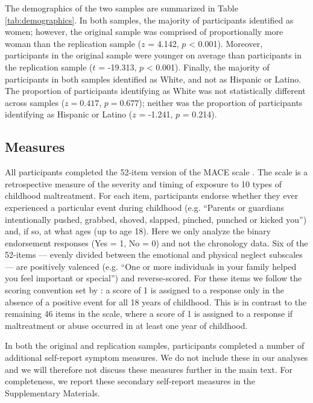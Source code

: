\documentclass[letterpaper,man,natbib,floatsintext,longtable]{apa6}
\begin{document}
The demographics of the two samples are summarized in Table \ref{tab:demographics}. In both samples, the majority of participants identified as women; however, the original sample was comprised of proportionally more woman than the replication sample ($z$ = 4.142, $p$ < 0.001). Moreover, participants in the original sample were younger on average than participants in the replication sample ($t$ = -19.313, $p$ < 0.001). Finally, the majority of participants in both samples identified as White, and not as Hispanic or Latino. The proportion of participants identifying as White was not statistically different across samples ($z = 0.417$, $p = 0.677$); neither was the proportion of participants identifying as Hispanic or Latino ($z$ = -1.241, $p$ = 0.214).

\subsection{Measures}

All participants completed the 52-item version of the MACE scale \citep{teicher2015maltreatment}. The scale is a retrospective measure of the severity and timing of exposure to 10 types of childhood maltreatment. For each item, participants endorse whether they ever experienced a particular event during childhood (e.g. ``Parents or guardians intentionally pushed, grabbed, shoved, slapped, pinched, punched or kicked you'') and, if so, at what ages (up to age 18). Here we only analyze the binary endorsement responses (Yes = 1, No = 0) and not the chronology data. Six of the 52-items --- evenly divided between the emotional and physical neglect subscales --- are positively valenced (e.g. ``One or more individuals in your family helped you feel important or special'') and reverse-scored. For these items we follow the scoring convention set by \cite{teicher2015maltreatment}: a score of 1 is assigned to a response only in the absence of a positive event for all 18 years of childhood. This is in contrast to the remaining 46 items in the scale, where a score of 1 is assigned to a response if maltreatment or abuse occurred in at least one year of childhood.

In both the original and replication samples, participants completed a number of additional self-report symptom measures. We do not include these in our analyses and we will therefore not discuss these measures further in the main text. For completeness, we report these secondary self-report measures in the Supplementary Materials. 
\end{document}
